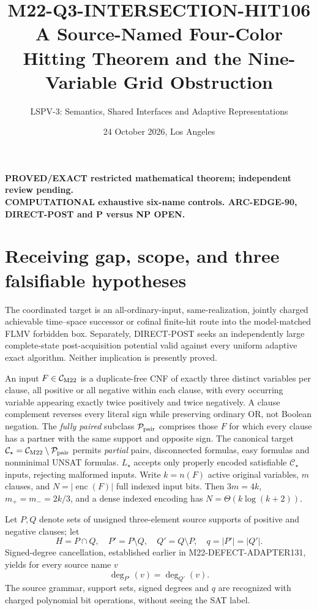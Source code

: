 \documentclass[11pt]{article}
\title{M22-Q3-INTERSECTION-HIT106\\A Source-Named Four-Color Hitting Theorem and the Nine-Variable Grid Obstruction}
\author{LSPV-3: Semantics, Shared Interfaces and Adaptive Representations}
\date{24 October 2026, Los Angeles}
\newcommand{\CM}{\mathcal C_{\rm M22}}
\newcommand{\CS}{\mathcal C_\star}
\begin{document}
\maketitle
\begin{center}
\textbf{PROVED/EXACT restricted mathematical theorem; independent review pending.}\\
\textbf{COMPUTATIONAL exhaustive six-name controls. ARC-EDGE-90, DIRECT-POST and P versus NP OPEN.}
\end{center}

\section{Receiving gap, scope, and three falsifiable hypotheses}
The coordinated target is an all-ordinary-input, same-realization, jointly
charged achievable time--space successor or cofinal finite-hit route into the
model-matched FLMV forbidden box. Separately, DIRECT-POST seeks an
independently large complete-state post-acquisition potential valid against
every uniform adaptive exact algorithm. Neither implication is presently
proved.

An input $F\in\CM$ is a duplicate-free CNF of exactly three distinct
variables per clause, all positive or all negative within each clause,
with every occurring variable appearing exactly twice positively and twice
negatively. A clause complement reverses every literal sign while
preserving ordinary OR, not Boolean negation. The \emph{fully paired}
subclass $\mathcal P_{\rm pair}$ comprises those $F$ for which every clause
has a partner with the same support and opposite sign.
The canonical target $\CS=\CM\setminus\mathcal P_{\rm pair}$ permits
\emph{partial} pairs, disconnected formulas, easy formulas and
nonminimal UNSAT formulas. $L_\star$ accepts only properly encoded
satisfiable $\CS$ inputs, rejecting malformed inputs. Write
$k=n(F)$ active original variables, $m$ clauses, and $N=|\operatorname{enc}(F)|$
full indexed input bits. Then
$3m=4k$, $m_+=m_-=2k/3$, and a dense indexed encoding has
$N=\Theta(k\log(k+2))$.

Let $P,Q$ denote sets of unsigned three-element source supports of
positive and negative clauses; let
\[
H=P\cap Q,\quad P'=P\setminus Q,\quad Q'=Q\setminus P,
\quad q=|P'|=|Q'|.
\]
Signed-degree cancellation, established earlier in
M22-DEFECT-ADAPTER131, yields for every source name $v$
\[
\deg_{P'}(v)=\deg_{Q'}(v).                         \tag{1}
\]
The source grammar, support sets, signed degrees and $q$ are recognized
with charged polynomial bit operations, without seeing the SAT label.
\end{document}
